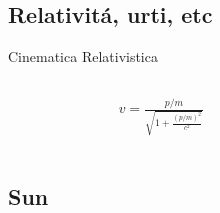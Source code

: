 \subsection{Relativit\'a, urti, etc}
\begin{frame}{Cinematica Relativistica}
    \begin{columns}[T]
        \begin{column}{0.5\textwidth}
            \begin{align*}
                &v=\frac{p/m}{\sqrt{1+\frac{(p/m)^2}{c^2}}}
            \end{align*}
        \end{column}
        \begin{column}{0.5\textwidth}
            
        \end{column}
    \end{columns}
    
\end{frame}

\subsection{Sun}


